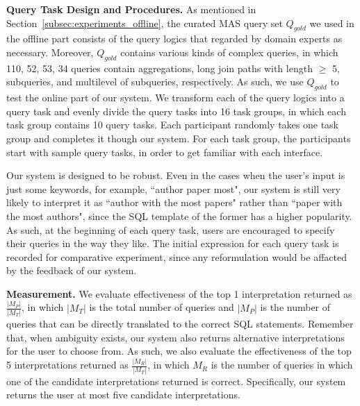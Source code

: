 \documentclass{vldb}
\begin{document}
\textbf{Query Task Design and Procedures.}
As mentioned in Section~\ref{subsec:experiments_offline}, the curated MAS query set $Q_{gold}$ we used in the offline part consists of the query logics that regarded by domain experts as necessary.  Moreover, $Q_{gold}$ contains various kinds of complex queries, in which 110, 52, 53, 34 queries contain aggregations, long join paths with length $\geq$ 5, subqueries, and multilevel of subqueries, respectively.  As such, we use $Q_{gold}$ to test the online part of our system.  We transform each of the query logics into a query task and evenly divide the query tasks into 16 task groups, in which each task group contains 10 query tasks.  Each participant randomly takes one task group and completes it though our system.  For each task group, the participants start with sample query tasks, in order to get familiar with each interface. 

Our system is designed to be robust. Even in the cases when the user’s input is just some keywords, for example, ``author paper most", our system is still very likely to interpret it as ``author with the most papers" rather than ``paper with the most authors", since the SQL template of the former has a higher popularity.  As such, at the beginning of each query task, users are encouraged to specify their queries in the way they like.  The initial expression for each query task is recorded for comparative experiment, since any reformulation would be affacted by the feedback of our system.

\textbf{Measurement.}
We evaluate effectiveness of the top 1 interpretation returned as $\frac{|M_P|}{|M_T|}$, in which $|M_T|$ is the total number of queries and $|M_P|$ is the number of queries that can be directly translated to the correct SQL statements.  Remember that, when ambiguity exists, our system also returns alternative interpretations for the user to choose from.  As such, we also evaluate the effectiveness of the top 5 interpretations returned as $\frac{|M_R|}{|M_T|}$, in which $M_R$ is the number of queries in which one of the candidate interpretations returned is correct.  Specifically, our system returns the user at most five candidate interpretations.  
\end{document}
